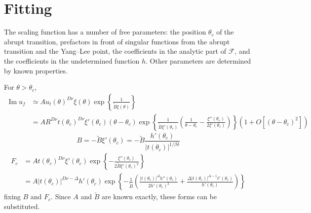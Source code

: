 \documentclass[
  aps,
  pre,
  preprint,
  longbibliography,
  floatfix
]{revtex4-2}
\begin{document}
\section{Fitting}

The scaling function has a number of free parameters: the position $\theta_c$ of the abrupt transition, prefactors in front of singular functions from the abrupt transition and the Yang--Lee point, the coefficients in the analytic part of $\mathcal F$, and the coefficients in the undetermined function $h$. Other parameters are determined by known properties.

For $\theta>\theta_c$,
\begin{equation}
  \begin{aligned}
    \operatorname{Im}u_f
    &\simeq A u_t(\theta)^{D\nu}\xi(\theta)\exp\left\{\frac1{\tilde B\xi(\theta)}\right\} \\
    &=AR^{D\nu}t(\theta_c)^{D\nu}\xi'(\theta_c)(\theta-\theta_c)
    \exp\left\{\frac1{\tilde B\xi'(\theta_c)}\left(\frac1{\theta-\theta_c}
      -\frac{\xi''(\theta_c)}{2\xi'(\theta_c)}\right)
      \right\}\left(1+O[(\theta-\theta_c)^2]\right)
  \end{aligned}
\end{equation}
\begin{equation}
  B=-\tilde B\xi'(\theta_c)=-\tilde B\frac{h'(\theta_c)}{|t(\theta_c)|^{1/\beta\delta}}
\end{equation}
\begin{equation}
  \begin{aligned}
    F_c&=At(\theta_c)^{D\nu}\xi'(\theta_c)\exp\left\{
    -\frac{\xi''(\theta_c)}{2\tilde B\xi'(\theta_c)^2}
  \right\} \\
       &=
       A|t(\theta_c)|^{D\nu-\Delta}h'(\theta_c)
       \exp\left\{-\frac1{\tilde B}\left(\frac{|t(\theta_c)|^\Delta h''(\theta_c)}{2h'(\theta_c)^2}+\frac{\Delta|t(\theta_c)|^{\Delta - 1} t'(\theta_c)}{h'(\theta_c)}
       \right)\right\} 
  \end{aligned}
\end{equation}
fixing $B$ and $F_c$. Since $A$ and $\tilde B$ are known exactly, these forms can be substituted.
\end{document}
